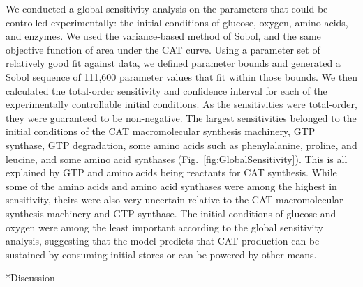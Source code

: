 \documentclass[12pt]{article}
\makeatletter
\renewcommand\section{\@startsection
	{subsection}{2}{0mm}
	{-0.2in}
	{0.05\baselineskip}
	{\normalfont\large\bfseries}}
\makeatother
\begin{document}
We conducted a global sensitivity analysis on the parameters that could be controlled experimentally: the initial conditions of glucose, oxygen, amino acids, and enzymes.
We used the variance-based method of Sobol, and the same objective function of area under the CAT curve.
Using a parameter set of relatively good fit against data, we defined parameter bounds and generated a Sobol sequence of 111,600 parameter values that fit within those bounds.
We then calculated the total-order sensitivity and confidence interval for each of the experimentally controllable initial conditions.
As the sensitivities were total-order, they were guaranteed to be non-negative.
The largest sensitivities belonged to the initial conditions of the CAT macromolecular synthesis machinery, GTP synthase, GTP degradation, some amino acids such as phenylalanine, proline, and leucine, and some amino acid synthases (Fig.~\ref{fig:GlobalSensitivity}).
This is all explained by GTP and amino acids being reactants for CAT synthesis.
While some of the amino acids and amino acid synthases were among the highest in sensitivity, theirs were also very uncertain relative to the CAT macromolecular synthesis machinery and GTP synthase.
The initial conditions of glucose and oxygen were among the least important according to the global sensitivity analysis, suggesting that the model predicts that CAT production can be sustained by consuming initial stores or can be powered by other means.

\clearpage

\section*{Discussion}

\end{document}
